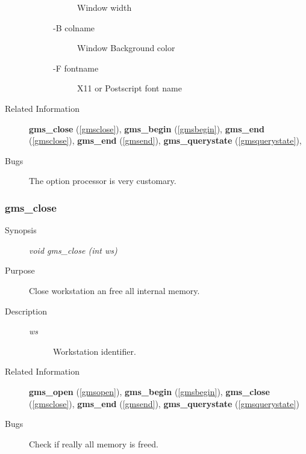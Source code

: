 \begin{description}
\begin{description}
\begin{description}
 Window width
\item[     -B colname]\mbox{}

 Window Background color
\item[    -F fontname]\mbox{}

 
X11 or Postscript font name
                    
\end{description}
\end{description}

\item[Related Information]\mbox{}


{\bf gms\_close} (\ref{gmsclose}), 
{\bf gms\_begin} (\ref{gmsbegin}), 
{\bf gms\_end} (\ref{gmsclose}), 
{\bf gms\_end} (\ref{gmsend}), 
{\bf gms\_querystate} (\ref{gmsquerystate}),
\item[Bugs]\mbox{}


The option processor is very customary.
\end{description}





\newpage



\subsubsection{gms\_close\label{gmsclose}}
\begin{description}
\item[Synopsis]\mbox{}


{\em void    gms\_close (int  ws)\/}
\item[Purpose]\mbox{}


Close workstation an free all internal memory.
\item[Description]\mbox{}


\begin{description}
\item[{\em ws\/}]\mbox{}

 Workstation identifier.
\end{description}

\item[Related Information]\mbox{}


{\bf gms\_open} (\ref{gmsopen}), 
{\bf gms\_begin} (\ref{gmsbegin}), 
{\bf gms\_close} (\ref{gmsclose}), 
{\bf gms\_end} (\ref{gmsend}),
{\bf gms\_querystate} (\ref{gmsquerystate})
\item[Bugs]\mbox{}


Check if really all memory is freed. 
\end{description}





